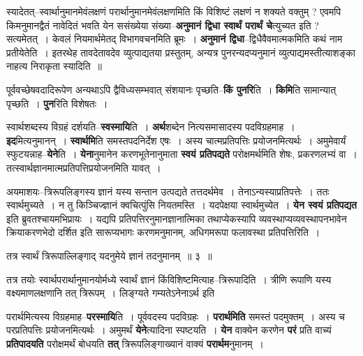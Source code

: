 \documentclass[article,12pt,a4paper]{memoir}
\begin{document}
	  \pstart स्यादेतत्--स्वार्थानुमानमेवंलक्षणं परार्थानुमानमेवंलक्षणमिति किं विशिष्टं लक्षणं न शक्यते वक्तुम् ? एवमपि किमनुमानद्वैतं नावेदितं भवति येन ससंख्येया संख्या--\textbf{अनुमानं द्विधा स्वार्थं परार्थं चे}त्युच्यत इति ? सत्यमेतत् । केवलं नियमार्थमेतद् विभागवचनमिति ब्रूमः । \textbf{अनुमानं द्विधा}--द्विधैवैवमात्मकमिति कथं नाम \leavevmode{} प्रतीयेतेति । इतरथेह तावदेतावदेव व्युत्पाद्यतया प्रस्तुतम्, अन्यत्र पुनरन्यदप्यनुमानं व्युत्पाद्यमस्तीत्याशङ्का नाहत्य निराकृता स्यादिति ॥
	\pend
      

	  \pstart पूर्ववच्छेषवदादिरूपेण अन्यथाऽपि द्वैविध्यसम्भवात् संशयानः पृच्छति--\textbf{किं पुनरि}ति । \textbf{किमि}ति सामान्यात् पृच्छति । \textbf{पुन}रिति विशेषतः ।
	\pend
      

	  \pstart स्वार्थशब्दस्य विग्रहं दर्शयति--\textbf{स्वस्मायि}ति । \textbf{अर्थ}शब्देन नित्यसमासादस्य पदविग्रहमाह । \textbf{इद}मित्यनुमानन् । \textbf{स्वार्थमि}ति समस्तपदनिर्देश एषः । अस्य चात्मप्रतिपत्तिः प्रयोजनमित्यर्थः । अमुमेवार्यं स्फुटयन्नाह--\textbf{येने}ति । \textbf{येना}नुमानेन करणभूतेनानुमाता \textbf{स्वयं प्रतिपद्यते} परोक्षमर्थमिति शेषः, प्रकरणलभ्यं वा । तत्स्वार्थज्ञानमात्मप्रतिपत्तिप्रयोजनमिति यावत् ।
	\pend
      

	  \pstart अयमाशयः--त्रिरूपलिङ्गस्य ज्ञानं यस्य सन्तान उत्पद्यते तत्तदर्थमेव । तेनाऽन्यस्याप्रतिपत्तेः । ततः स्वार्थमुच्यते । न तु किञ्चिज्ज्ञानं क्वचित्पुंसि नियतमस्ति । यदपेक्षया स्वार्थमुच्येत । \textbf{येन स्वयं प्रतिपद्यत} इति ब्रुवतश्चायमभिप्रायः । यद्यपि प्रतिपत्तिरनुमानज्ञानात्मिका तथाप्येकस्यापि व्यवस्थाप्यव्यवस्थापनभावेन क्रियाकरणभेदो दर्शित इति सारूप्यभागः करणमनुमानम्, अधिगमरूपा फलावस्था प्रतिपत्तिरिति ।
	\pend
	  \bigskip
	  \begingroup
	

	  \pstart तत्र स्वार्थं त्रिरूपाल्लिङ्गाद् यदनुमेये ज्ञानं तदनुमानम् ॥ ३ ॥
	\pend
      
	  \endgroup
	
	  \bigskip
	  \begingroup
	

	  \pstart तत्र तयोः स्वार्थपरार्थानुमानयोर्मध्ये स्वार्थं ज्ञानं किंविशिष्टमित्याह--त्रिरूपादिति । त्रीणि रूपाणि यस्य वक्ष्यमाणलक्षणानि तत् त्रिरूपम् । लिङ्ग्यते गम्यतेऽनेनाऽर्थ इति
	\pend
      
	  \endgroup
	

	  \pstart परार्थमित्यस्य विग्रहमाह--\textbf{परस्मायि}ति । पूर्ववदस्य पदविग्रहः । \textbf{परार्थमिति} समस्तं पदमुक्तम् । अस्य च परप्रतिपत्तिः प्रयोजनमित्यर्थः । अमुमर्थं \textbf{येने}त्यादिना स्पष्टयति । \textbf{येन} वाक्येन करणेन \textbf{परं} प्रति वाच्यं \textbf{प्रतिपादयति} परोक्षमर्थं बोधयति \textbf{तत्} त्रिरूपलिङ्गाख्यानं वाक्यं \textbf{परार्थम}नुमानम् ।
	\pend
      
\end{document}
